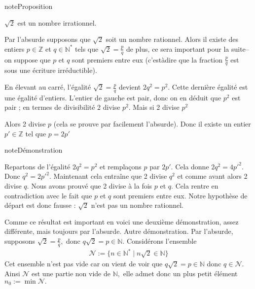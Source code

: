 \documentclass[letterpaper,10pt,french]{jupyterBook}
\begin{document}
\begin{sphinxadmonition}{note}{Proposition}

\sphinxAtStartPar
\(\sqrt{2}\) est un nombre irrationnel.
\end{sphinxadmonition}

\sphinxAtStartPar
Par l’absurde supposons que \(\sqrt{2}\) soit un nombre rationnel. Alors il existe des entiers \(p\in\mathbb{Z}\) et \(q\in \mathbb{N}^{*}\) tels que \(\sqrt{2}=\frac{p}{q}\) de plus, ce sera important pour la suite– on suppose que \(p\) et \(q\) sont premiers entre eux (c’est\sphinxhyphen{}à\sphinxhyphen{}dire que la fraction \(\frac{p}{q}\) est sous une écriture irréductible).

\sphinxAtStartPar
En élevant au carré, l’égalité \(\sqrt{2}=\frac{p}{q}\) devient \(2q^2=p^2\). Cette dernière égalité est une égalité d’entiers. L’entier de gauche est pair, donc on en déduit que \(p^2\) est pair ; en termes de divisibilité 2 divise \(p^2\).
Mais si 2 divise \(p^2\)

\sphinxAtStartPar
Alors 2 divise \(p\) (cela se prouve par facilement l’absurde). Donc il existe un entier \(p'\in \mathbb{Z}\) tel que \(p=2p'\)

\begin{sphinxadmonition}{note}{Démonstration}

\sphinxAtStartPar
Repartons de l’égalité \(2q^2=p^2\) et remplaçons \(p\) par \(2p'.\) Cela donne \(2q^2=4p'^{2}\). Donc \(q^2=2p'^{2}.\)
Maintenant cela entraîne que 2 divise \(q^2\) et comme avant alors 2 divise \(q.\)
Nous avons prouvé que 2 divise à la fois \(p\) et \(q.\) Cela rentre en contradiction avec le fait que \(p\) et \(q\) sont premiers entre eux. Notre hypothèse de départ est donc fausse : \(\sqrt{2}\) n’est pas un nombre rationnel.
\end{sphinxadmonition}

\sphinxAtStartPar
Comme ce résultat est important en voici une deuxième démonstration, assez différente, mais toujours par l’absurde.
Autre démonstration. Par l’absurde, supposons \(\sqrt{2}=\frac{p}{q},\) donc \(q\sqrt{2}=p\in \mathbb{N}.\) Considérons l’ensemble
\begin{equation*}
\begin{split}
\mathcal{N}:=\{n\in \mathbb{N}^{*}\mid n\sqrt{2}\in \mathbb{N}\}
\end{split}
\end{equation*}
\sphinxAtStartPar
Cet ensemble n’est pas vide car on vient de voir que \(q\sqrt{2}=p\in \mathbb{N}\) donc \(q\in \mathcal{N}.\) Ainsi \(\mathcal{N}\) est une partie non vide de \(\mathbb{N},\)
elle admet donc un plus petit élément \(n_0 :=\min \mathcal{N}.\)
\end{document}
